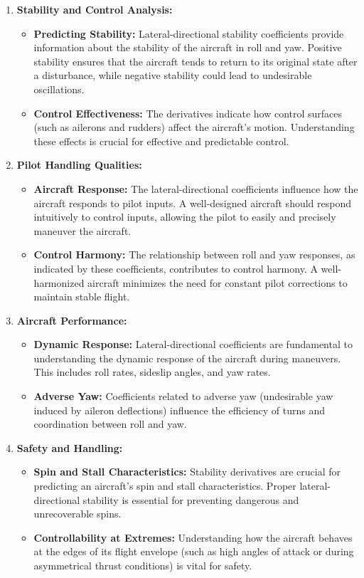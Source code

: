 \documentclass[a4paper, twoside]{article}
\begin{document}
\begin{enumerate}
    \item \textbf{Stability and Control Analysis:}
    \begin{itemize}
        \item \textbf{Predicting Stability:} Lateral-directional stability coefficients provide information about the stability of the aircraft in roll and yaw. Positive stability ensures that the aircraft tends to return to its original state after a disturbance, while negative stability could lead to undesirable oscillations.
        \item \textbf{Control Effectiveness:} The derivatives indicate how control surfaces (such as ailerons and rudders) affect the aircraft's motion. Understanding these effects is crucial for effective and predictable control.
    \end{itemize}
    
    \item \textbf{Pilot Handling Qualities:}
    \begin{itemize}
        \item \textbf{Aircraft Response:} The lateral-directional coefficients influence how the aircraft responds to pilot inputs. A well-designed aircraft should respond intuitively to control inputs, allowing the pilot to easily and precisely maneuver the aircraft.
        \item \textbf{Control Harmony:} The relationship between roll and yaw responses, as indicated by these coefficients, contributes to control harmony. A well-harmonized aircraft minimizes the need for constant pilot corrections to maintain stable flight.
    \end{itemize}
    
    \item \textbf{Aircraft Performance:}
    \begin{itemize}
        \item \textbf{Dynamic Response:} Lateral-directional coefficients are fundamental to understanding the dynamic response of the aircraft during maneuvers. This includes roll rates, sideslip angles, and yaw rates.
        \item \textbf{Adverse Yaw:} Coefficients related to adverse yaw (undesirable yaw induced by aileron deflections) influence the efficiency of turns and coordination between roll and yaw.
    \end{itemize}
    
    \item \textbf{Safety and Handling:}
    \begin{itemize}
        \item \textbf{Spin and Stall Characteristics:} Stability derivatives are crucial for predicting an aircraft's spin and stall characteristics. Proper lateral-directional stability is essential for preventing dangerous and unrecoverable spins.
        \item \textbf{Controllability at Extremes:} Understanding how the aircraft behaves at the edges of its flight envelope (such as high angles of attack or during asymmetrical thrust conditions) is vital for safety.
    \end{itemize}
    

\end{enumerate}
\end{document}

